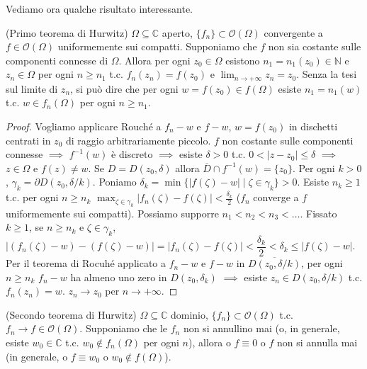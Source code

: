 Vediamo ora qualche risultato interessante.

\begin{thm}
  (Primo teorema di Hurwitz) $\Omega \subseteq \mathbb{C}$ aperto, $\{f_n\} \subset \mathcal{O}(\Omega)$ convergente a $f\in \mathcal{O}(\Omega)$ uniformemente sui compatti. Supponiamo che $f$ non sia costante sulle componenti connesse di $\Omega$.
  Allora per ogni $z_0 \in \Omega$ esistono $n_1=n_1(z_0) \in \mathbb{N}$ e $z_n \in \Omega$ per ogni $n \ge n_1$ t.c. $f_n(z_n)=f(z_0)$ e $\displaystyle \lim_{n \longrightarrow +\infty} z_n=z_0$.
  Senza la tesi sul limite di $z_n$, si può dire che per ogni $w=f(z_0) \in f(\Omega)$ esiste $n_1=n_1(w)$ t.c. $w \in f_n(\Omega)$ per ogni $n \ge n_1$.
\end{thm}

\begin{proof}
  Vogliamo applicare Rouché a $f_n-w$ e $f-w$, $w=f(z_0)$ in dischetti centrati in $z_0$ di raggio arbitrariamente piccolo. $f$ non costante sulle componenti connesse $\implies$ $f^{-1}(w)$ è discreto $\implies$ esiste $\delta>0$ t.c. $0<|z-z_0| \le \delta$ $\implies$ $z \in \Omega$ e $f(z) \not=w$.
  Se $D=D(z_0, \delta)$ allora $\overline{D} \cap f^{-1}(w)=\{z_0\}$. Per ogni $k>0$, $\gamma_k=\partial D(z_0, \delta/k)$. Poniamo $\delta_k=\min\{|f(\zeta)-w| \mid \zeta \in \gamma_k\}>0$.
  Esiste $n_k \ge 1$ t.c. per ogni $n \ge n_k$ $\displaystyle \max_{\zeta \in \gamma_k} |f_n(\zeta)-f(\zeta)|<\frac{\delta_k}{2}$ ($f_n$ converge a $f$ uniformemente sui compatti). Possiamo supporre $n_1<n_2<n_3<\dots$.
  Fissato $k \ge 1$, se $n \ge n_k$ e $\zeta \in \gamma_k$, $|(f_n(\zeta)-w)-(f(\zeta)-w)|=|f_n(\zeta)-f(\zeta)|<\dfrac{\delta_k}{2}<\delta_k \le |f(\zeta)-w|$.
  Per il teorema di Rocuhé applicato a $f_n-w$ e $f-w$ in $\overline{D(z_0, \delta/k)}$, per ogni $n \ge n_k$ $f_n-w$ ha almeno uno zero in $D(z_0, \delta_k)$ $\implies$ esiste $z_n \in D(z_0, \delta/k)$ t.c. $f_n(z_n)=w$. $z_n \longrightarrow z_0$ per $n \longrightarrow +\infty$.
\end{proof}

\begin{cor}
  (Secondo teorema di Hurwitz) $\Omega \subseteq \mathbb{C}$ dominio, $\{f_n\} \subset \mathcal{O}(\Omega)$ t.c. $f_n \longrightarrow f \in \mathcal{O}(\Omega)$. Supponiamo che le $f_n$ non si annullino mai (o, in generale, esiste $w_0 \in \mathbb{C}$ t.c. $w_0 \not\in f_n(\Omega)$ per ogni $n$),
  allora o $f \equiv 0$ o $f$ non si annulla mai (in generale, o $f \equiv w_0$ o $w_0 \not\in f(\Omega)$).
\end{cor}

